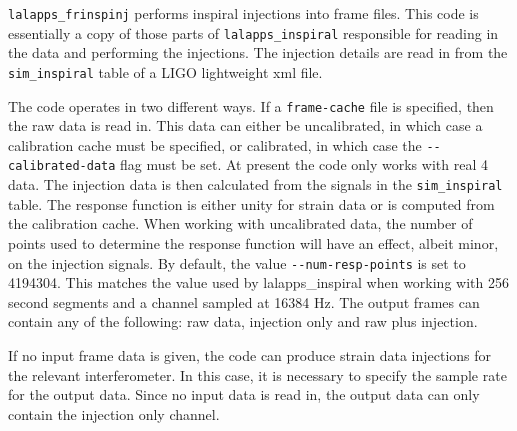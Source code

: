 \begin{entry}
\verb$lalapps_frinspinj$ performs inspiral injections into frame files.
This code is essentially a copy of those parts of
\verb$lalapps_inspiral$ responsible for reading in the data and
performing the injections.  The injection details are read in from the 
\verb$sim_inspiral$ table of a LIGO lightweight xml file.  

The code operates in two different ways.  If a \verb$frame-cache$ file
is specified, then the raw data is read in.  This data can either be
uncalibrated, in which case a calibration cache must be specified, or
calibrated, in which case the \verb$--calibrated-data$ flag must be set.
At present the code only works with real 4 data.  The injection data is
then calculated from the signals in the \verb$sim_inspiral$ table.  The
response function is either unity for strain data or is computed from
the calibration cache.  When working with uncalibrated data, the number
of points used to determine the response function will have an effect,
albeit minor, on the injection signals.  By default, the value
\verb$--num-resp-points$ is set to 4194304.  This matches the value
used by lalapps\_inspiral when working with 256 second segments and a
channel sampled at 16384 Hz.  The output frames can contain any of
the following: raw data, injection only and raw plus injection.  

If no input frame data is given, the code can produce strain data
injections for the relevant interferometer.  In this case, it is
necessary to specify the sample rate for the output data.  Since no
input data is read in, the output data can only contain the injection
only channel.


\end{entry}
